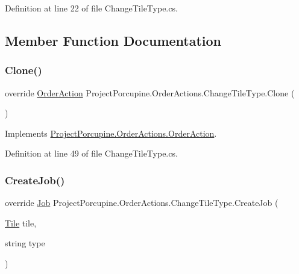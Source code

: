 Definition at line 22 of file Change\+Tile\+Type.\+cs.



\subsection{Member Function Documentation}
\mbox{\label{class_project_porcupine_1_1_order_actions_1_1_change_tile_type_a6eabfaa08b85dfbed31c79a53f5d65f3}} 
\subsubsection{\texorpdfstring{Clone()}{Clone()}}
{\footnotesize\ttfamily override \hyperlink{class_project_porcupine_1_1_order_actions_1_1_order_action}{Order\+Action} Project\+Porcupine.\+Order\+Actions.\+Change\+Tile\+Type.\+Clone (\begin{DoxyParamCaption}{ }\end{DoxyParamCaption})\hspace{0.3cm}{\ttfamily [virtual]}}



Implements \hyperlink{class_project_porcupine_1_1_order_actions_1_1_order_action_a34bd9be15055adc6c5397db3aab7bc5f}{Project\+Porcupine.\+Order\+Actions.\+Order\+Action}.



Definition at line 49 of file Change\+Tile\+Type.\+cs.

\mbox{\label{class_project_porcupine_1_1_order_actions_1_1_change_tile_type_aa8d1da1aa2599aa6abe5e1c57c541c92}} 
\subsubsection{\texorpdfstring{Create\+Job()}{CreateJob()}}
{\footnotesize\ttfamily override \hyperlink{class_job}{Job} Project\+Porcupine.\+Order\+Actions.\+Change\+Tile\+Type.\+Create\+Job (\begin{DoxyParamCaption}\item[{\hyperlink{class_tile}{Tile}}]{tile,  }\item[{string}]{type }\end{DoxyParamCaption})\hspace{0.3cm}{\ttfamily [virtual]}}



